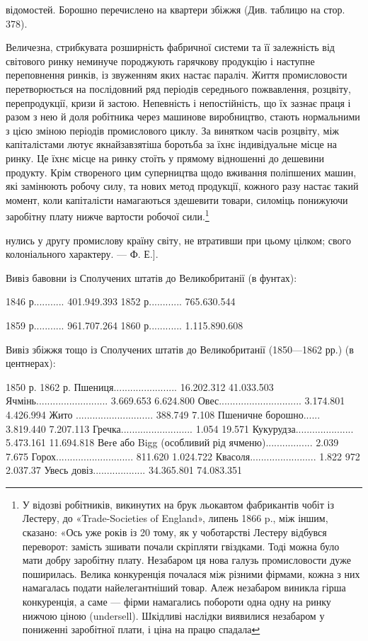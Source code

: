 відомостей. Борошно перечислено на квартери збіжжя (Див.
таблицю на стор. 378).

Величезна, стрибкувата розширність фабричної системи та
її залежність від світового ринку неминуче породжують гарячкову
продукцію і наступне переповнення ринків, із звуженням
яких настає параліч. Життя промисловости перетворюється на
послідовний ряд періодів середнього пожвавлення, розцвіту,
перепродукції, кризи й застою. Непевність і непостійність, що
їх зазнає праця і разом з нею й доля робітника через машинове
виробництво, стають нормальними з цією зміною періодів промислового
циклу. За винятком часів розцвіту, між капіталістами лютує
якнайзавзятіша боротьба за їхнє індивідуальне місце на ринку.
Це їхнє місце на ринку стоїть у прямому відношенні до дешевини
продукту. Крім створеного цим суперництва щодо вживання
поліпшених машин, які замінюють робочу силу, та нових метод
продукції, кожного разу настає такий момент, коли капіталісти
намагаються здешевити товари, силоміць понижуючи заробітну
плату нижче вартости робочої сили.\footnote{
У відозві робітників, викинутих на брук льокавтом фабрикантів
чобіт із Лестеру, до «Trade-Societies of England», липень 1866 p., між
іншим, сказано: «Ось уже років із 20 тому, як у чоботарстві Лестеру
відбувся переворот: замість зшивати почали скріпляти гвіздками. Тоді
можна було мати добру заробітну плату. Незабаром ця нова галузь промисловости
дуже поширилась. Велика конкуренція почалася між різними
фірмами, кожна з них намагалась подати найелегантніший товар. Алеж
незабаром виникла гірша конкуренція, а саме — фірми намагались побороти
одна одну на ринку нижчою ціною (undersell). Шкідливі наслідки виявилися
незабаром у пониженні заробітної плати, і ціна на працю спадала
}

нулись у другу промислову країну світу, не втративши при цьому цілком;
свого колоніального характеру. — Ф. Е.].

Вивіз бавовни із Сполучених штатів до Великобританії (в фунтах):

1846 р........... 401.949.393    1852 р............ 765.630.544

1859 р........... 961.707.264    1860 р............ 1.115.890.608

Вивіз збіжжя тощо із Сполучених штатів до Великобританії
(1850—1862 рр.) (в центнерах):

                                                            1850 р.                 1862 р.
Пшениця.......................        16.202.312           41.033.503
Ячмінь..........................           3.669.653           6.624.800
Овес..............................         3.174.801             4.426.994
Жито ............................            388.749                7.108
Пшеничне борошно......            3.819.440           7.207.113
Гречка..........................              1.054                  19.571
Кукурудза.....................          5.473.161         11.694.818
Веrе або Bigg (особливий
рід ячменю).................             2.039                    7.675
Горох............................          811.620              1.024.722
Квасоля........................        1.822 972              2.037.37
Увесь довіз...................          34.365.801            74.083.351